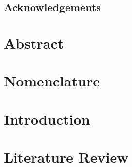 \documentclass[a4paper,10pt, twoside]{report}
\begin{document}
    
    
    \pagestyle{plain}
    
    \cleardoublepage
    
    

    \vspace*{\fill}
    \begingroup
        \section*{Acknowledgements}
        
    \endgroup
    \vspace*{\fill}
    \cleardoublepage
    
    

    \chapter*{Abstract}\label{sec:abstract}
        
    \cleardoublepage

    
    \chapter*{Nomenclature}\label{sec:nomenclature}
        
    \cleardoublepage


    \tableofcontents
    \cleardoublepage


    \pagestyle{fancy}      %
    
    
    \chapter{Introduction}\label{sec:introduction}
        
    \cleardoublepage
    
    
    \chapter{Literature Review}\label{sec:lit_review}
        
    \cleardoublepage
\end{document}
